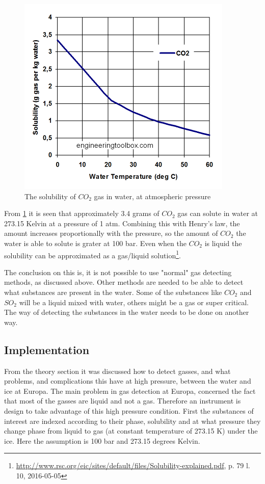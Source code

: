 \begin{figure}[htb]
  \centering
  \includegraphics[scale=0.4]{figures/GasDetectionAgge/CO2Solubility}
  \caption{The solubility of $CO_2$ gas in water, at atmospheric pressure}
  \label{fig:SolubilityofCO2}
\end{figure}

From \ref{fig:SolubilityofCO2} it is seen that approximately 3.4 grams of $CO_2$ gas can solute in water at 273.15 Kelvin at a pressure of 1 atm. Combining this with Henry's law, the amount increases proportionally with the pressure, so the amount of $CO_2$ the water is able to solute is grater at 100 bar. Even when the $CO_2$ is liquid the solubility can be approximated as a gas/liquid solution\footnote{\url{http://www.rsc.org/eic/sites/default/files/Solubility-explained.pdf}, p. 79 l. 10, 2016-05-05}.

The conclusion on this is, it is not possible to use "normal" gas detecting methods, as discussed above. Other methods are needed to be able to detect what substances are present in the water. Some of the substances like $CO_2$ and $SO_2$ will be a liquid mixed with water, others might be a gas or super critical. The way of detecting the substances in the water needs to be done on another way.

\subsection{Implementation}

From the theory section it was discussed how to detect gasses, and what problems, and complications this have at high pressure, between the water and ice at Europa. The main problem in gas detection at Europa, concerned the fact that most of the gasses are liquid and not a gas. Therefore an instrument is design to take advantage of this high pressure condition. First the substances of interest are indexed according to their phase, solubility and at what pressure they change phase from liquid to gas (at constant temperature of 273.15 K) under the ice. Here the assumption is 100 bar and 273.15 degrees Kelvin.

